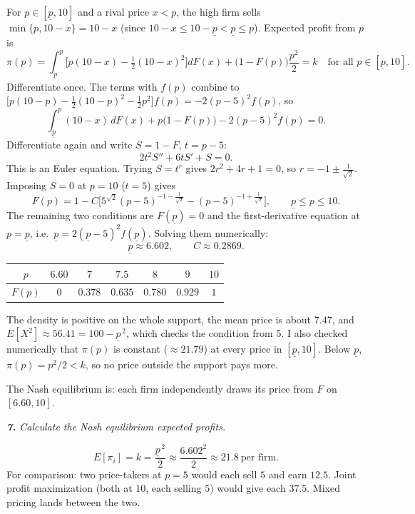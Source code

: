 \documentclass[11pt]{article}
\newcommand{\question}[1]{\par\smallskip\noindent\colorbox{black!6}{\parbox{\dimexpr\linewidth-2\fboxsep}{\itshape #1}}\par\smallskip}
\begin{document}
For $p\in[\underline p,10]$ and a rival price $x<p$, the high firm sells $\min\{p,10-x\}=10-x$ (since $10-x\le10-\underline p<\underline p\le p$). Expected profit from $p$ is
\[
\pi(p)=\int_{\underline p}^{p}\Big[p(10-x)-\tfrac12(10-x)^2\Big]dF(x)+\big(1-F(p)\big)\frac{p^2}{2}=k \quad\text{for all } p\in[\underline p,10].
\]
Differentiate once. The terms with $f(p)$ combine to $\big[p(10-p)-\tfrac12(10-p)^2-\tfrac12p^2\big]f(p)=-2(p-5)^2f(p)$, so
\[
\int_{\underline p}^{p}(10-x)\,dF(x)+p\big(1-F(p)\big)-2(p-5)^2f(p)=0 .
\]
Differentiate again and write $S=1-F$, $t=p-5$:
\[
2t^2S''+6tS'+S=0 .
\]
This is an Euler equation. Trying $S=t^r$ gives $2r^2+4r+1=0$, so $r=-1\pm\tfrac{1}{\sqrt2}$. Imposing $S=0$ at $p=10$ ($t=5$) gives
\[
F(p)=1-C\Big[5^{\sqrt2}(p-5)^{-1-\frac{1}{\sqrt2}}-(p-5)^{-1+\frac{1}{\sqrt2}}\Big],\qquad \underline p\le p\le10 .
\]
The remaining two conditions are $F(\underline p)=0$ and the first-derivative equation at $p=\underline p$, i.e.\ $\underline p=2(\underline p-5)^2f(\underline p)$. Solving them numerically:
\[
\underline p\approx6.602,\qquad C\approx0.2869 .
\]
\begin{center}
\begin{tabular}{c|cccccc}
$p$ & $6.60$ & $7$ & $7.5$ & $8$ & $9$ & $10$\\ \hline
$F(p)$ & $0$ & $0.378$ & $0.635$ & $0.780$ & $0.929$ & $1$
\end{tabular}
\end{center}
The density is positive on the whole support, the mean price is about $7.47$, and $E[X^2]\approx56.41=100-\underline p^{\,2}$, which checks the condition from 5. I also checked numerically that $\pi(p)$ is constant ($\approx21.79$) at every price in $[\underline p,10]$. Below $\underline p$, $\pi(p)=p^2/2<k$, so no price outside the support pays more.

The Nash equilibrium is: each firm independently draws its price from $F$ on $[6.60,10]$.

\question{\textbf{7.} Calculate the Nash equilibrium expected profits.}

\[
E[\pi_i]=k=\frac{\underline p^{\,2}}{2}\approx\frac{6.602^2}{2}\approx21.8\ \text{per firm}.
\]
For comparison: two price-takers at $p=5$ would each sell $5$ and earn $12.5$. Joint profit maximization (both at $10$, each selling 5) would give each $37.5$. Mixed pricing lands between the two.
\end{document}
